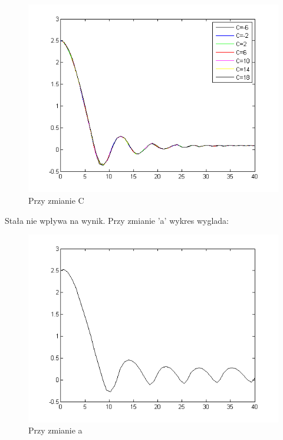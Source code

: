 \documentclass[a4paper,10pt]{article}
\begin{document}
\begin{enumerate}
\begin{figure}[!h]
    \centering
	\includegraphics[width=120mm]{CW3-korekcja-trojpolozeniowy-e_C.png}
	\caption{Przy zmianie C}
    \label{fig:Rysunek}
\end{figure}
Stała nie wpływa na wynik.
\newpage
Przy zmianie 'a' wykres wyglada:
\begin{figure}[!h]
    \centering
	\includegraphics[width=120mm]{CW3-korekcja-trojpolozeniowyBH-e_a.png}
	\caption{Przy zmianie a}
    \label{fig:Rysunek}
\end{figure}


\newpage


\end{enumerate}
\end{document}
